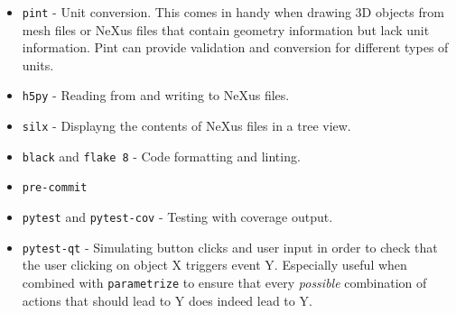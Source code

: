 \begin{itemize}
\item \texttt{pint} - Unit conversion. This comes in handy when drawing 3D objects from mesh files or NeXus files that contain geometry information but lack unit information. Pint can provide validation and conversion for different types of units. 
\item \texttt{h5py} - Reading from and writing to NeXus files.
\item \texttt{silx} - Displayng the contents of NeXus files in a tree view.
\end{itemize}
\begin{itemize}
\item \texttt{black} and \texttt{flake 8} - Code formatting and linting.
\item \texttt{pre-commit} 
\item \texttt{pytest} and \texttt{pytest-cov} - Testing with coverage output.
\item \texttt{pytest-qt} - Simulating button clicks and user input in order to check that the user clicking on object X triggers event Y. Especially useful when combined with \texttt{parametrize} to ensure that every \textit{possible} combination of actions that should lead to Y does indeed lead to Y.
\end{itemize}
